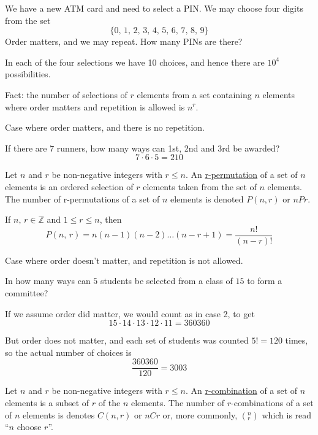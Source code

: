 \begin{example}
    We have a new ATM card and need to select a PIN. We may choose four digits from the set 
    \[\{0,\,1,\,2,\,3,\,4,\,5,\,6,\,7,\,8,\,9\}\]
    Order matters, and we may repeat. How many PINs are there?

    In each of the four selections we have 10 choices, and hence there are $10^4$ possibilities.
\end{example}

Fact: the number of selections of $r$ elements from a set containing $n$ elements where order matters and repetition is allowed is $n^r$.

Case where order matters, and there is no repetition.

\begin{example}
    If there are 7 runners, how many ways can 1st, 2nd and 3rd be awarded? $$7\cdot 6\cdot 5 = 210$$
\end{example}

\begin{definition}
    Let $n$ and $r$ be non-negative integers with $r\leq n$. An \underline{r-permutation} of a set of $n$ elements is an ordered selection of $r$ elements taken from the set of $n$ elements. The number of r-permutations of a set of $n$ elements is denoted $P(n,r)$ or $nPr$.
\end{definition}

\newpage
\begin{theorm}
    If $n,\,r\in\mathbb Z$ and $1\leq r\leq n$, then $$P(n,\,r) = n(n-1)(n-2)\dots (n-r+1) = \frac{n!}{\left(n-r\right)!}$$
\end{theorm}

Case where order doesn't matter, and repetition is not allowed.

\begin{example}
    In how many ways can $5$ students be selected from a class of $15$ to form a committee?

    If we assume order did matter, we would count as in case 2, to get $$15\cdot 14\cdot 13\cdot 12\cdot 11 = 360360$$

    But order does not matter, and each set of students was counted $5! = 120$ times, so the actual number of choices is $$\frac{360360}{120} = 3003$$
\end{example}

\begin{definition}
    Let $n$ and $r$ be non-negative integers with $r\leq n$. An \underline{r-combination} of a set of $n$ elements is a subset of $r$ of the $n$ elements. The number of $r$-combinations of a set of $n$ elements is denotes $C(n,r)$ or $nCr$ or, more commonly, $\left(^n_r\right)$ which is read ``$n$ choose $r$''.
\end{definition}

